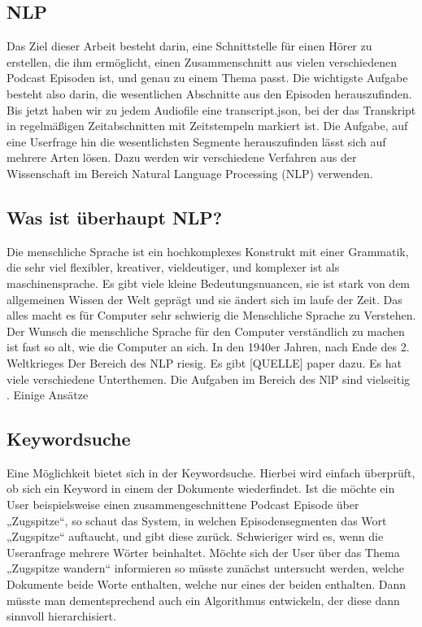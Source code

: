 \subsection{NLP}

Das Ziel dieser Arbeit besteht darin, eine Schnittstelle für einen Hörer zu erstellen, die ihm ermöglicht, einen Zusammenschnitt aus vielen verschiedenen Podcast Episoden ist, und genau zu einem Thema passt. 
Die wichtigste Aufgabe besteht also darin, die wesentlichen Abschnitte aus den Episoden herauszufinden. 
Bis jetzt haben wir zu jedem Audiofile eine transcript.json, bei der das Transkript in regelmäßigen Zeitabschnitten mit Zeitstempeln markiert ist. 
Die Aufgabe, auf eine Userfrage hin die wesentlichsten Segmente herauszufinden lässt sich auf mehrere Arten lösen. 
Dazu werden wir verschiedene Verfahren aus der Wissenschaft im Bereich Natural Language Processing (NLP) verwenden.

\subsection{Was ist überhaupt NLP?}

Die menschliche Sprache ist ein hochkomplexes Konstrukt mit einer Grammatik, die sehr viel flexibler, kreativer, vieldeutiger, und komplexer ist als maschinensprache. 
Es gibt viele kleine Bedeutungsnuancen, sie ist stark von dem allgemeinen Wissen der Welt geprägt und sie ändert sich im laufe der Zeit. 
Das alles macht es für Computer sehr schwierig die Menschliche Sprache zu Verstehen. 
Der Wunsch die menschliche Sprache für den Computer verständlich zu machen ist fast so alt, wie die Computer an sich. 
In den 1940er Jahren, nach Ende des 2. Weltkrieges 
Der Bereich des NLP riesig. 
Es gibt [QUELLE] paper dazu. 
Es hat viele verschiedene Unterthemen. 
Die Aufgaben im Bereich des NlP sind vielseitig . Einige Ansätze 

\subsection{Keywordsuche}


Eine Möglichkeit bietet sich in der Keywordsuche. 
Hierbei wird einfach überprüft, ob sich ein Keyword in einem der Dokumente wiederfindet. Ist die möchte ein User beispielsweise einen zusammengeschnittene Podcast Episode über „Zugspitze“, so schaut das System, in welchen Episodensegmenten das Wort „Zugspitze“ auftaucht, und gibt diese zurück. 
Schwieriger wird es, wenn die Useranfrage mehrere Wörter beinhaltet. 
Möchte sich der User über das Thema „Zugspitze wandern“ informieren so müsste zunächst untersucht werden, welche Dokumente beide Worte enthalten, welche nur eines der beiden enthalten. 
Dann müsste man dementsprechend auch ein Algorithmus entwickeln, der diese dann sinnvoll hierarchisiert. 

